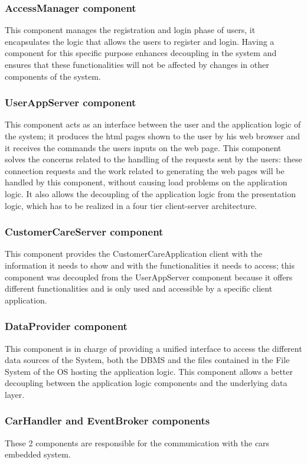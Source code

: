 \subsubsection{AccessManager component}
This component manages the registration and login phase of users, it encapsulates the logic that allows the users to register and login. Having a component for this specific purpose enhances decoupling in the system and ensures that these functionalities will not be affected by changes in other components of the system.

\subsubsection{UserAppServer component}
This component acts as an interface between the user and the application logic of the system; it produces the html pages shown to the user by his web browser and it receives the commands the users inputs on the web page. This component solves the concerns related to the handling of the requests sent by the users: these connection requests and the work related to generating the web pages will be handled by this component, without causing load problems on the application logic. It also allows the decoupling of the application logic from the presentation logic, which has to be realized in a four tier client-server architecture.

\subsubsection{CustomerCareServer component}
This component provides the CustomerCareApplication client with the information it needs to show and with the functionalities it needs to access; this component was decoupled from the UserAppServer component because it offers different functionalities and is only used and accessible by a specific client application.

\subsubsection{DataProvider component}
This component is in charge of providing a unified interface to access the different data sources of the System, both the DBMS and the files contained in the File System of the OS hosting the application logic. This component allows a better decoupling between the application logic components and the underlying data layer.

\subsubsection{CarHandler and EventBroker components}
These 2 components are responsible for the communication with the cars embedded system.
